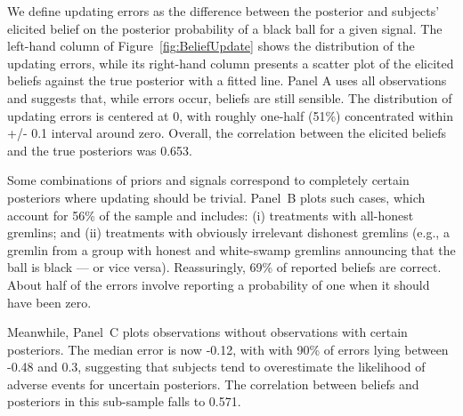 \documentclass[12pt,a4paper]{article}
\begin{document}
\begin{figure}[H]
	\hfill
	\hfill
\end{figure}

We define updating errors as the difference between the posterior and subjects' elicited belief on the posterior probability of a black ball for a given signal.  The left-hand column of Figure~\ref{fig:BeliefUpdate} shows the distribution of the updating errors, while its right-hand column presents a scatter plot of the elicited beliefs against the true posterior with a fitted line.
Panel A uses all observations and suggests that, while errors occur, beliefs are still sensible. The distribution of updating errors is centered at 0, with roughly one-half (51\%) concentrated within +/- 0.1 interval around zero. Overall, the correlation between the elicited beliefs and the true posteriors was 0.653.  

Some combinations of priors and signals correspond to completely certain posteriors where updating should be trivial.  
Panel~B plots such cases, which account for 56\% of the sample and includes: (i) treatments with all-honest gremlins; and (ii) treatments with obviously irrelevant dishonest gremlins (e.g., a gremlin from a group with honest and white-swamp gremlins announcing that the ball is black --- or vice versa). Reassuringly, 69\% of reported beliefs are correct. About half of the errors involve reporting a probability of one when it should have been zero.

Meanwhile, Panel~C plots observations without observations with certain posteriors. The median error is now -0.12, with with 90\% of errors lying between -0.48 and 0.3, suggesting that subjects tend to overestimate the likelihood of adverse events for uncertain posteriors. The correlation between beliefs and posteriors in this sub-sample falls to 0.571.  
\end{document}
